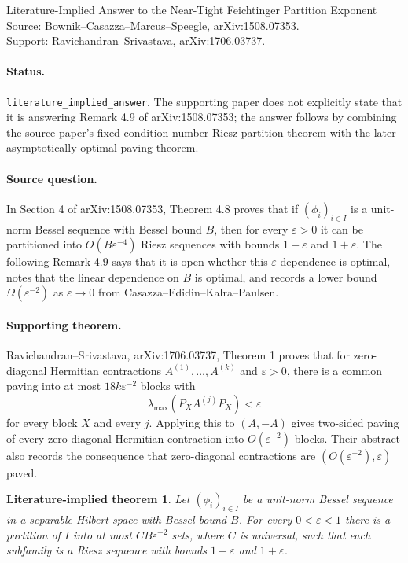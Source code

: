 \documentclass[11pt]{article}
\newtheorem*{theorem}{Literature-implied theorem}
\begin{document}
\begin{center}
{\Large Literature-Implied Answer to the Near-Tight Feichtinger Partition Exponent}\\[0.5em]
{\normalsize Source: Bownik--Casazza--Marcus--Speegle, arXiv:1508.07353.}\\
{\normalsize Support: Ravichandran--Srivastava, arXiv:1706.03737.}
\end{center}

\paragraph{Status.}
\texttt{literature\_implied\_answer}.  The supporting paper does not explicitly
state that it is answering Remark 4.9 of arXiv:1508.07353; the answer follows
by combining the source paper's fixed-condition-number Riesz partition theorem
with the later asymptotically optimal paving theorem.

\paragraph{Source question.}
In Section 4 of arXiv:1508.07353, Theorem 4.8 proves that if
$(\phi_i)_{i\in I}$ is a unit-norm Bessel sequence with Bessel bound $B$, then
for every $\varepsilon>0$ it can be partitioned into
$O(B\varepsilon^{-4})$ Riesz sequences with bounds $1-\varepsilon$ and
$1+\varepsilon$.  The following Remark 4.9 says that it is open whether this
$\varepsilon$-dependence is optimal, notes that the linear dependence on $B$ is
optimal, and records a lower bound $\Omega(\varepsilon^{-2})$ as
$\varepsilon\to0$ from Casazza--Edidin--Kalra--Paulsen.

\paragraph{Supporting theorem.}
Ravichandran--Srivastava, arXiv:1706.03737, Theorem 1 proves that for
zero-diagonal Hermitian contractions $A^{(1)},\ldots,A^{(k)}$ and
$\varepsilon>0$, there is a common paving into at most
$18k\varepsilon^{-2}$ blocks with
\[
  \lambda_{\max}(P_X A^{(j)} P_X)<\varepsilon
\]
for every block $X$ and every $j$.  Applying this to $(A,-A)$ gives
two-sided paving of every zero-diagonal Hermitian contraction into
$O(\varepsilon^{-2})$ blocks.  Their abstract also records the consequence that
zero-diagonal contractions are $(O(\varepsilon^{-2}),\varepsilon)$ paved.

\begin{theorem}
Let $(\phi_i)_{i\in I}$ be a unit-norm Bessel sequence in a separable Hilbert
space with Bessel bound $B$.  For every $0<\varepsilon<1$ there is a partition
of $I$ into at most $C B\varepsilon^{-2}$ sets, where $C$ is universal, such
that each subfamily is a Riesz sequence with bounds
$1-\varepsilon$ and $1+\varepsilon$.
\end{theorem}
\end{document}
